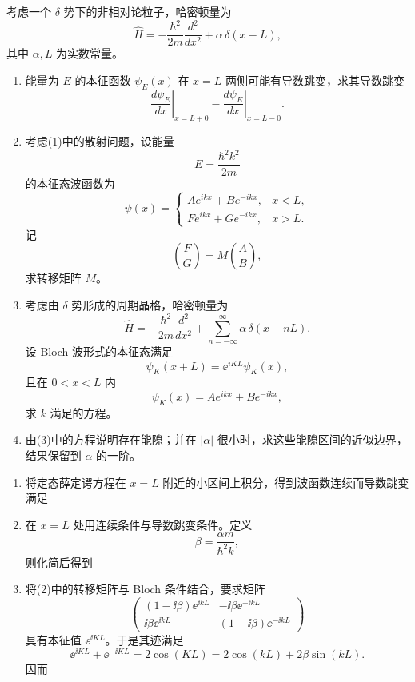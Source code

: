 \begin{question}
考虑一个 $\delta$ 势下的非相对论粒子，哈密顿量为
\[
\hat H=-\frac{\hbar^2}{2m}\frac{d^2}{dx^2}+\alpha\,\delta(x-L),
\]
其中 $\alpha,L$ 为实数常量。

\begin{enumerate}[label=(\arabic*),leftmargin=2.5em]
  \item 能量为 $E$ 的本征函数 $\psi_E(x)$ 在 $x=L$ 两侧可能有导数跳变，求其导数跳变
  \[
  \left.\frac{d\psi_E}{dx}\right|_{x=L+0}-\left.\frac{d\psi_E}{dx}\right|_{x=L-0}.
  \]
  \item 考虑(1)中的散射问题，设能量
  \[
  E=\frac{\hbar^2 k^2}{2m}
  \]
  的本征态波函数为
  \[
  \psi(x)=
  \begin{cases}
  Ae^{ikx}+Be^{-ikx}, & x<L,\\
  Fe^{ikx}+Ge^{-ikx}, & x>L.
  \end{cases}
  \]
  记
  \[
  \binom{F}{G}=M\binom{A}{B},
  \]
  求转移矩阵 $M$。
  \item 考虑由 $\delta$ 势形成的周期晶格，哈密顿量为
  \[
  \hat H=-\frac{\hbar^2}{2m}\frac{d^2}{dx^2}+\sum_{n=-\infty}^{\infty}\alpha\,\delta(x-nL).
  \]
  设 Bloch 波形式的本征态满足
  \[
  \psi_K(x+L)=\ee^{iKL}\psi_K(x),
  \]
  且在 $0<x<L$ 内
  \[
  \psi_K(x)=Ae^{ikx}+Be^{-ikx},
  \]
  求 $k$ 满足的方程。
  \item 由(3)中的方程说明存在能隙；并在 $|\alpha|$ 很小时，求这些能隙区间的近似边界，结果保留到 $\alpha$ 的一阶。
\end{enumerate}

\begin{solution}
\begin{enumerate}[label=(\arabic*),leftmargin=2.5em]
  \item 将定态薛定谔方程在 $x=L$ 附近的小区间上积分，得到波函数连续而导数跳变满足

  \item 在 $x=L$ 处用连续条件与导数跳变条件。定义
  \[
  \beta=\frac{\alpha m}{\hbar^2 k},
  \]
  则化简后得到

  \item 将(2)中的转移矩阵与 Bloch 条件结合，要求矩阵
  \[
  \begin{pmatrix}
  (1-\ii\beta)\ee^{\ii kL} & -\ii\beta \ee^{-\ii kL}\\
  \ii\beta \ee^{\ii kL} & (1+\ii\beta)\ee^{-\ii kL}
  \end{pmatrix}
  \]
  具有本征值 $\ee^{\ii KL}$。于是其迹满足
  \[
  \ee^{\ii KL}+\ee^{-\ii KL}=2\cos(KL)=2\cos(kL)+2\beta\sin(kL).
  \]
  因而


\end{enumerate}
\end{solution}
\end{question}
